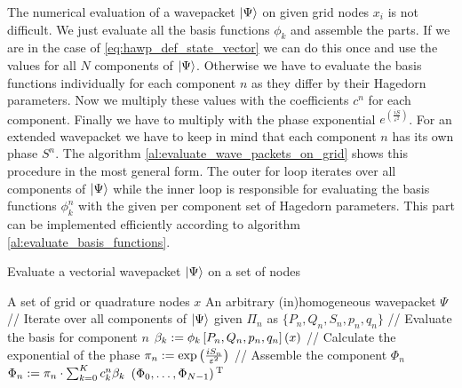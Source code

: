 The numerical evaluation of a wavepacket $\Ket{\Psi}$ on given grid nodes $x_i$
is not difficult. We just evaluate all the basis functions $\phi_k$ and assemble the parts.
If we are in the case of \eqref{eq:hawp_def_state_vector} we can do this once and use the values
for all $N$ components of $\Ket{\Psi}$. Otherwise we have to evaluate the basis
functions individually for each component $n$ as they differ by their Hagedorn parameters.
Now we multiply these values with the coefficients $c^n$ for each component. Finally
we have to multiply with the phase exponential $e^{\left(\frac{i S}{\varepsilon^2}\right)}$.
For an extended wavepacket we have to keep in mind that each component $n$ has its
own phase $S^n$. The algorithm \ref{al:evaluate_wave_packets_on_grid} shows this
procedure in the most general form. The outer for loop iterates over all components
of $\Ket{\Psi}$ while the inner loop is responsible for evaluating the basis functions
$\phi_k^n$ with the given per component set of Hagedorn parameters. This part can
be implemented efficiently according to algorithm \ref{al:evaluate_basis_functions}.


\begin{algorithm}
\caption{Evaluate a vectorial wavepacket $\Ket{\Psi}$ on a set of nodes}
\label{al:evaluate_wave_packets_on_grid}
\begin{algorithmic}
  \REQUIRE A set of grid or quadrature nodes $x$
  \REQUIRE An arbitrary (in)homogeneous wavepacket $\Psi$
  \STATE // Iterate over all components of $\Ket{\Psi}$
    \STATE given $\Pi_n$ as $\{P_n,Q_n,S_n,p_n,q_n\}$
    \STATE // Evaluate the basis for component $n$
      \STATE $\beta_k := \phi_k \left[P_n, Q_n, p_n, q_n\right] \left( x \right)$
    \ENDFOR
    \STATE // Calculate the exponential of the phase
    \STATE $\pi_n := \exp\left( \frac{i S_n}{\varepsilon^2} \right)$
    \STATE // Assemble the component $\Phi_n$
    \STATE $\Phi_n := \pi_n \cdot \sum_{k=0}^K c^n_k \beta_k$
  \ENDFOR
  \RETURN $\left(\Phi_0, \ldots, \Phi_{N-1}\right){}^{\textnormal{T}}$
\end{algorithmic}
\end{algorithm}
